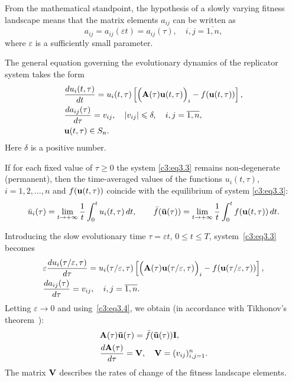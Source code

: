 \documentclass[12pt]{report}
\theoremstyle{definition}
\theoremstyle{remark}
\begin{document}
From the mathematical standpoint, the hypothesis of a slowly varying fitness landscape means that the matrix elements $a_{ij}$ can be written as
$$
	a_{ij} = a_{ij}(\varepsilon t) = a_{ij}(\tau), \quad i, j = \overline{1, n},
$$
where $\varepsilon$ is a sufficiently small parameter.

The general equation governing the evolutionary dynamics of the replicator system takes the form
\begin{equation}
	\begin{aligned}
		&\displaystyle\frac{du_{i}(t,\tau)}{dt} = u_{i}(t,\tau)\left[\Big({\bf A}(\tau){\bf u}(t,\tau)\Big)_{i} - f({\bf u}(t,\tau))\right], \\
		&\displaystyle\frac{da_{ij}(\tau)}{d\tau} = v_{ij}, \quad |v_{ij}| \leqslant \delta, \quad i, j = \overline{1, n}, \\
		&{\bf u}(t,\tau) \in S_{n}.
	\end{aligned}
	\label{c3:eq3.3}
\end{equation}
Here $\delta$ is a positive number.

If for each fixed value of $\tau \geqslant 0$ the system \eqref{c3:eq3.3} remains non-degenerate (permanent), then the time-averaged values of the functions $u_i(t, \tau)$, $i = 1, 2, \ldots, n$ and $f({\bf u}(t, \tau))$ coincide with the equilibrium of system \eqref{c3:eq3.3}:
\begin{equation}
	\bar{u}_{i}(\tau) = \lim_{t \to +\infty}\frac{1}{t}\int_{0}^{t}u_{i}(t, \tau)\,dt, \qquad \bar{f}({\bf \bar{u}}(\tau)) = \lim_{t \to +\infty}\frac{1}{t}\int_{0}^{t}f({\bf u}(t, \tau))\,dt.
	\label{c3:eq3.4}
\end{equation}

Introducing the slow evolutionary time $\tau = \varepsilon t$, $0 \leqslant t \leqslant T$,
system~\eqref{c3:eq3.3} becomes
\begin{align*}
&\varepsilon\frac{du_i(\tau/\varepsilon, \tau)}{d\tau} =
u_i(\tau/\varepsilon, \tau)
\left[\Big({\bf A}(\tau){\bf u}(\tau/\varepsilon, \tau)\Big)_i
- f({\bf u}(\tau/\varepsilon, \tau))\right],
\\
&\frac{da_{ij}(\tau)}{d\tau} = v_{ij}, \quad i,j = \overline{1,n}.
\end{align*}
Letting $\varepsilon \to 0$ and using~\eqref{c3:eq3.4}, we obtain (in accordance with Tikhonov's theorem~\cite{c3:Tihonov1948}):
$$
	\begin{aligned}
		&{\bf A}(\tau){\bf \bar{u}}(\tau) = \bar{f}({\bf \bar{u}}(\tau)){\bf I}, \\
		&\frac{d{\bf A}(\tau)}{d\tau} = {\bf V}, \quad {\bf V} = (v_{ij})_{i, j = 1}^{n}.
	\end{aligned}
$$
The matrix ${\bf V}$ describes the rates of change of the fitness landscape elements.
\end{document}
